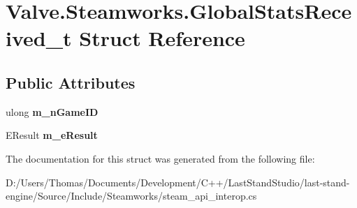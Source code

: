 \hypertarget{structValve_1_1Steamworks_1_1GlobalStatsReceived__t}{}\section{Valve.\+Steamworks.\+Global\+Stats\+Received\+\_\+t Struct Reference}
\label{structValve_1_1Steamworks_1_1GlobalStatsReceived__t}
\subsection*{Public Attributes}
\begin{DoxyCompactItemize}
\item 
\hypertarget{structValve_1_1Steamworks_1_1GlobalStatsReceived__t_aa5591ac8ee4ebd6f1d378860d526752c}{}ulong {\bfseries m\+\_\+n\+Game\+I\+D}\label{structValve_1_1Steamworks_1_1GlobalStatsReceived__t_aa5591ac8ee4ebd6f1d378860d526752c}

\item 
\hypertarget{structValve_1_1Steamworks_1_1GlobalStatsReceived__t_a98c41add485b559849a3782261206d8f}{}E\+Result {\bfseries m\+\_\+e\+Result}\label{structValve_1_1Steamworks_1_1GlobalStatsReceived__t_a98c41add485b559849a3782261206d8f}

\end{DoxyCompactItemize}


The documentation for this struct was generated from the following file\+:\begin{DoxyCompactItemize}
\item 
D\+:/\+Users/\+Thomas/\+Documents/\+Development/\+C++/\+Last\+Stand\+Studio/last-\/stand-\/engine/\+Source/\+Include/\+Steamworks/steam\+\_\+api\+\_\+interop.\+cs\end{DoxyCompactItemize}
